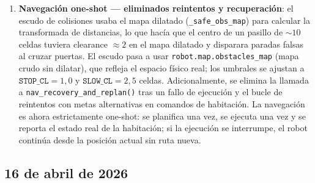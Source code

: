 \documentclass[11pt,a4paper]{article}
\begin{document}
\begin{enumerate}
  \item \textbf{Navegación one-shot — eliminados reintentos y recuperación}:
        el escudo de colisiones usaba el mapa dilatado (\texttt{\_safe\_obs\_map})
        para calcular la transformada de distancias, lo que hacía que el centro de
        un pasillo de $\sim10$ celdas tuviera clearance $\approx 2$ en el mapa
        dilatado y disparara paradas falsas al cruzar puertas. El escudo pasa a usar
        \texttt{robot.map.obstacles\_map} (mapa crudo sin dilatar), que refleja el
        espacio físico real; los umbrales se ajustan a
        $\texttt{STOP\_CL}=1{,}0$ y $\texttt{SLOW\_CL}=2{,}5$ celdas.
        Adicionalmente, se elimina la llamada a \texttt{nav\_recovery\_and\_replan()}
        tras un fallo de ejecución y el bucle de reintentos con metas alternativas
        en comandos de habitación. La navegación es ahora estrictamente one-shot:
        se planifica una vez, se ejecuta una vez y se reporta el estado real de la
        habitación; si la ejecución se interrumpe, el robot continúa desde la posición
        actual sin ruta nueva.
\end{enumerate}

\subsection*{16 de abril de 2026}
\end{document}
